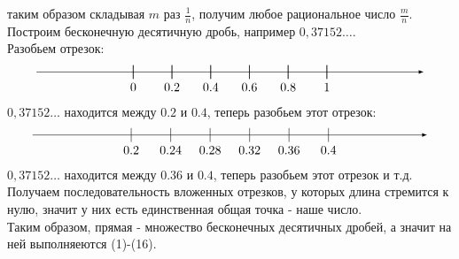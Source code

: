 \documentclass[a4paper, 12pt]{article}
\theoremstyle{definition}
\begin{document}
        таким образом складывая $m$ раз $\frac{1}{n}$, получим любое рациональное число $\frac{m}{n}$.\\
        Построим бесконечную десятичную дробь, например $0,37152\dots$.\\
        Разобьем отрезок:
        \[\begin{tikzpicture} [scale=5.5]
        \draw[-latex] (-0.5,0) -- (1.5,0) ;
        \foreach \x in {0,0.2,0.4,0.6,0.8,1}
        \draw[shift={(\x,0)},color=black] (0pt,1pt) -- (0pt,-1pt);
        \foreach \x in {0,0.2,0.4,0.6,0.8,1}
        \draw[shift={(\x,0)},color=black] (0pt,1pt) -- (0pt,-1pt) node[below] 
        {$\x$};
        \end{tikzpicture}\]
        $0,37152\dots$ находится между $0.2$ и $0.4$, теперь разобьем этот отрезок:
        \[\begin{tikzpicture} [scale=28]
        \draw[-latex] (0.1,0) -- (0.5,0) ;
        \foreach \x in {0.2,0.24,0.28,0.32,0.36,0.4}
        \draw[shift={(\x,0)},color=black] (0pt,0.2pt) -- (0pt,0.2pt);
        \foreach \x in {0.2,0.24,0.28,0.32,0.36,0.4}
        \draw[shift={(\x,0)},color=black] (0pt,0.2pt) -- (0pt,-0.2pt) node[below] 
        {$\x$};
        \end{tikzpicture}\]
        $0,37152\dots$ находится между $0.36$ и $0.4$, теперь разобьем этот отрезок и т.д.
        Получаем последовательность вложенных отрезков, у которых длина стремится к нулю, значит у них есть единственная общая точка - наше число.\\
        Таким образом, прямая - множество бесконечных десятичных дробей, а значит на ней выполняеются (1)-(16).
\end{document}
